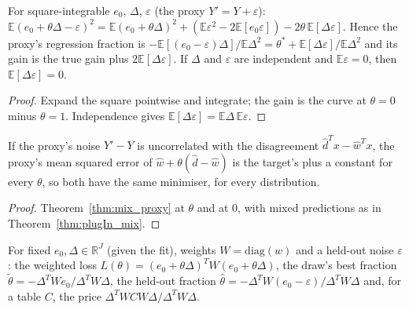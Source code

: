 \begin{theorem}\label{thm:mix_proxy}
  \leanok
  For square-integrable $e_0$, $\Delta$, $\varepsilon$ (the proxy $Y' = Y + \varepsilon$):
  $\mathbb E(e_0 + \theta\Delta - \varepsilon)^2 = \mathbb E(e_0 + \theta\Delta)^2
  + (\mathbb E\varepsilon^2 - 2\mathbb E[e_0\varepsilon]) - 2\theta\,\mathbb E[\Delta\varepsilon]$.
  Hence the proxy's regression fraction is
  $-\mathbb E[(e_0 - \varepsilon)\Delta]/\mathbb E\Delta^2 = \theta^* + \mathbb E[\Delta\varepsilon]/\mathbb E\Delta^2$
  and its gain is the true gain plus $2\mathbb E[\Delta\varepsilon]$. If $\Delta$ and $\varepsilon$ are
  independent and $\mathbb E\varepsilon = 0$, then $\mathbb E[\Delta\varepsilon] = 0$.
\end{theorem}
\begin{proof}
  \leanok
  Expand the square pointwise and integrate; the gain is the curve at $\theta = 0$ minus
  $\theta = 1$. Independence gives $\mathbb E[\Delta\varepsilon] = \mathbb E\Delta\,\mathbb E\varepsilon$.
\end{proof}

\begin{corollary}\label{cor:plugIn_mix_proxy}
  \leanok
  If the proxy's noise $Y' - Y$ is uncorrelated with the disagreement $\hat d^Tx - \hat w^Tx$, the
  proxy's mean squared error of $\hat w + \theta(\hat d - \hat w)$ is the target's plus a constant
  for every $\theta$, so both have the same minimiser, for every distribution.
\end{corollary}
\begin{proof}
  \leanok
  Theorem~\ref{thm:mix_proxy} at $\theta$ and at $0$, with mixed predictions as in
  Theorem~\ref{thm:plugIn_mix}.
\end{proof}

\begin{definition}\label{def:heldOut}
  \leanok
  For fixed $e_0, \Delta \in \mathbb R^J$ (given the fit), weights $W = \mathrm{diag}(w)$ and a
  held-out noise $\varepsilon$: the weighted loss $L(\theta) = (e_0 + \theta\Delta)^TW(e_0 + \theta\Delta)$,
  the draw's best fraction $\tilde\theta = -\Delta^TWe_0/\Delta^TW\Delta$, the held-out fraction
  $\hat\theta = -\Delta^TW(e_0 - \varepsilon)/\Delta^TW\Delta$ and, for a table $C$, the price
  $\Delta^TWCW\Delta/\Delta^TW\Delta$.
\end{definition}

